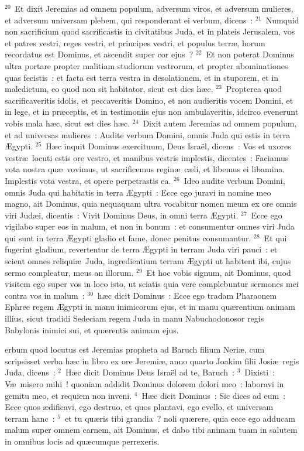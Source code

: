 ${}^{20}$~Et dixit Jeremias ad omnem populum, adversum viros, et adversum mulieres, et adversum universam plebem, qui responderant ei verbum, dicens~:
${}^{21}$~Numquid non sacrificium quod sacrificastis in civitatibus Juda, et in plateis Jerusalem, vos et patres vestri, reges vestri, et principes vestri, et populus terr\ae , horum recordatus est Dominus, et ascendit super cor ejus~?
${}^{22}$~Et non poterat Dominus ultra portare propter malitiam studiorum vestrorum, et propter abominationes quas fecistis~: et facta est terra vestra in desolationem, et in stuporem, et in maledictum, eo quod non sit habitator, sicut est dies h\ae c.
${}^{23}$~Propterea quod sacrificaveritis idolis, et peccaveritis Domino, et non audieritis vocem Domini, et in lege, et in pr\ae ceptis, et in testimoniis ejus non ambulaveritis, idcirco evenerunt vobis mala h\ae c, sicut est dies h\ae c.
${}^{24}$~Dixit autem Jeremias ad omnem populum, et ad universas mulieres~: Audite verbum Domini, omnis Juda qui estis in terra \AE gypti.
${}^{25}$~H\ae c inquit Dominus exercituum, Deus Isra\"el, dicens~: Vos et uxores vestr\ae\ locuti estis ore vestro, et manibus vestris implestis, dicentes~: Faciamus vota nostra qu\ae\ vovimus, ut sacrificemus regin\ae\ c\ae li, et libemus ei libamina. Implestis vota vestra, et opere perpetrastis ea.
${}^{26}$~Ideo audite verbum Domini, omnis Juda qui habitatis in terra \AE gypti~: Ecce ego juravi in nomine meo magno, ait Dominus, quia nequaquam ultra vocabitur nomen meum ex ore omnis viri Jud\ae i, dicentis~: Vivit Dominus Deus, in omni terra \AE gypti.
${}^{27}$~Ecce ego vigilabo super eos in malum, et non in bonum~: et consumentur omnes viri Juda qui sunt in terra \AE gypti gladio et fame, donec penitus consumantur.
${}^{28}$~Et qui fugerint gladium, revertentur de terra \AE gypti in terram Juda viri pauci~: et scient omnes reliqui\ae\ Juda, ingredientium terram \AE gypti ut habitent ibi, cujus sermo compleatur, meus an illorum.
${}^{29}$~Et hoc vobis signum, ait Dominus, quod visitem ego super vos in loco isto, ut sciatis quia vere complebuntur sermones mei contra vos in malum~:
${}^{30}$~h\ae c dicit Dominus~: Ecce ego tradam Pharaonem Ephree regem \AE gypti in manu inimicorum ejus, et in manu qu\ae rentium animam illius, sicut tradidi Sedeciam regem Juda in manu Nabuchodonosor regis Babylonis inimici sui, et qu\ae rentis animam ejus.

\bchapter
{}erbum quod locutus est Jeremias propheta ad Baruch filium Neri\ae , cum scripsisset verba h\ae c in libro ex ore Jeremi\ae , anno quarto Joakim filii Josi\ae\ regis Juda, dicens~:
${}^{2}$~H\ae c dicit Dominus Deus Isra\"el ad te, Baruch~:
${}^{3}$~Dixisti~: V\ae\ misero mihi~! quoniam addidit Dominus dolorem dolori meo~: laboravi in gemitu meo, et requiem non inveni.
${}^{4}$~H\ae c dicit Dominus~: Sic dices ad eum~: Ecce quos \ae dificavi, ego destruo, et quos plantavi, ego evello, et universam terram hanc~:
${}^{5}$~et tu qu\ae ris tibi grandia~? noli qu\ae rere, quia ecce ego adducam malum super omnem carnem, ait Dominus, et dabo tibi animam tuam in salutem in omnibus locis ad qu\ae cumque perrexeris.

